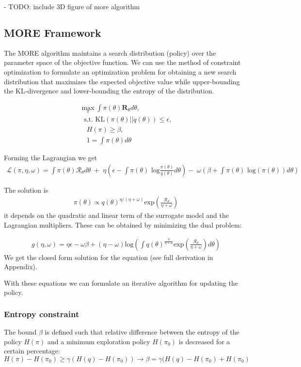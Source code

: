 - TODO: include 3D figure of more algorithm

\subsection{MORE Framework}
The MORE algorithm maintains a search distribution (policy) over the parameter space
of the objective function. We can use the method of constraint optimization
to formulate an optimization problem for obtaining a new search distribution that
maximizes the expected objective value while upper-bounding the KL-divergence and
lower-bounding the entropy of the distribution.

\begin{align}
 \max_{\pi} \int \pi(\theta) \mathbf{R}_{\theta} d\theta, \\
\; \text{ s.t. KL}(\pi(\theta)||q(\theta)) \leq \epsilon, \\
\quad H(\pi) \geq \beta, \\
\quad 1 = \int \pi(\theta) d\theta
\end{align}

Forming the Lagrangian we get
\begin{align} \mathcal{L}(\pi, \eta, \omega) = 
\int \pi(\theta) \mathcal{R}_{\theta} d\theta \; + \; 
\eta  \left(\epsilon - \int \pi(\theta) \text{ log}
 \frac{\pi(\theta)}{q(\theta)} d\theta\right)
 - \; \omega \left(\beta + \int \pi(\theta) \text{ log}(\pi(\theta)) d\theta\right)
\end{align}

The solution is
\begin{align}
\pi(\theta) \propto q(\theta)^{\eta/(\eta+\omega)} 
\text{exp}\left(\frac{\mathcal{R}_\theta}{\eta + \omega}\right)
\end{align}
it depends on the quadratic and linear term of the surrogate model and the
Lagrangian multipliers. These can be obtained by minimizing the dual problem:

\begin{align}
  g(\eta,\omega) = \eta\epsilon - \omega\beta + (\eta - \omega) \text{log}
\left(\int q(\theta)^{\frac{\eta}{\eta + \omega}}
  \text{exp}\left(\frac{\mathcal{R}_\theta}{\eta + \omega}\right) d\theta \right)
\end{align}
We get the closed form solution for the equation
(see full derivation in Appendix).

With these equations we can formulate an iterative algorithm for updating the policy.

\subsubsection{Entropy constraint}
The bound $\beta$ is defined such that relative difference between the entropy
of the policy $H(\pi)$ and a minimum exploration policy $H(\pi_0)$ is decreased
for a certain percentage:
$$ H(\pi) - H(\pi_0) \geq \gamma (H(q) - H(\pi_0))
\rightarrow \beta = \gamma (H(q) - H(\pi_0) + H(\pi_0) $$

